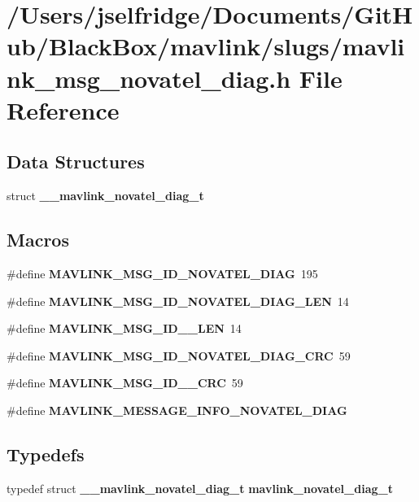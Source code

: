 \section{/\+Users/jselfridge/\+Documents/\+Git\+Hub/\+Black\+Box/mavlink/slugs/mavlink\+\_\+msg\+\_\+novatel\+\_\+diag.h File Reference}
\label{mavlink__msg__novatel__diag_8h}
\subsection*{Data Structures}
\begin{DoxyCompactItemize}
\item 
struct \textbf{ \+\_\+\+\_\+mavlink\+\_\+novatel\+\_\+diag\+\_\+t}
\end{DoxyCompactItemize}
\subsection*{Macros}
\begin{DoxyCompactItemize}
\item 
\#define \textbf{ M\+A\+V\+L\+I\+N\+K\+\_\+\+M\+S\+G\+\_\+\+I\+D\+\_\+\+N\+O\+V\+A\+T\+E\+L\+\_\+\+D\+I\+AG}~195
\item 
\#define \textbf{ M\+A\+V\+L\+I\+N\+K\+\_\+\+M\+S\+G\+\_\+\+I\+D\+\_\+\+N\+O\+V\+A\+T\+E\+L\+\_\+\+D\+I\+A\+G\+\_\+\+L\+EN}~14
\item 
\#define \textbf{ M\+A\+V\+L\+I\+N\+K\+\_\+\+M\+S\+G\+\_\+\+I\+D\+\_\+\_\+\+L\+EN}~14
\item 
\#define \textbf{ M\+A\+V\+L\+I\+N\+K\+\_\+\+M\+S\+G\+\_\+\+I\+D\+\_\+\+N\+O\+V\+A\+T\+E\+L\+\_\+\+D\+I\+A\+G\+\_\+\+C\+RC}~59
\item 
\#define \textbf{ M\+A\+V\+L\+I\+N\+K\+\_\+\+M\+S\+G\+\_\+\+I\+D\+\_\+\_\+\+C\+RC}~59
\item 
\#define \textbf{ M\+A\+V\+L\+I\+N\+K\+\_\+\+M\+E\+S\+S\+A\+G\+E\+\_\+\+I\+N\+F\+O\+\_\+\+N\+O\+V\+A\+T\+E\+L\+\_\+\+D\+I\+AG}
\end{DoxyCompactItemize}
\subsection*{Typedefs}
\begin{DoxyCompactItemize}
\item 
typedef struct \textbf{ \+\_\+\+\_\+mavlink\+\_\+novatel\+\_\+diag\+\_\+t} \textbf{ mavlink\+\_\+novatel\+\_\+diag\+\_\+t}
\end{DoxyCompactItemize}


